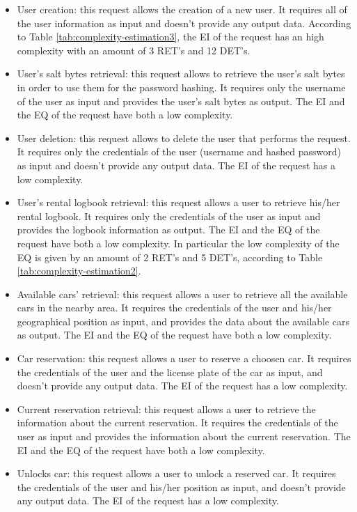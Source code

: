 \begin{itemize}
	\item User creation: this request allows the creation of a new user. It requires all of the user information as input and doesn't provide any output data. According to Table \ref{tab:complexity-estimation3}, the EI of the request has an high complexity with an amount of 3 RET's and 12 DET's.
	\item User's salt bytes retrieval: this request allows to retrieve the user's salt bytes in order to use them for the password hashing. It requires only the username of the user as input and provides the user's salt bytes as output. The EI and the EQ of the request have both a low complexity.
	\item User deletion: this request allows to delete the user that performs the request. It requires only the credentials of the user (username and hashed password) as input and doesn't provide any output data. The EI of the request has a low complexity.
	\item User's rental logbook retrieval: this request allows a user to retrieve his/her rental logbook. It requires only the credentials of the user as input and provides the logbook information as output. The EI and the EQ of the request have both a low complexity. In particular the low complexity of the EQ is given by an amount of 2 RET's and 5 DET's, according to Table \ref{tab:complexity-estimation2}.
	\item Available cars' retrieval: this request allows a user to retrieve all the available cars in the nearby area. It requires the credentials of the user and his/her geographical position as input, and provides the data about the available cars as output. The EI and the EQ of the request have both a low complexity.
	\item Car reservation: this request allows a user to reserve a choosen car. It requires the credentials of the user and the license plate of the car as input, and doesn't provide any output data. The EI of the request has a low complexity.
	\item Current reservation retrieval: this request allows a user to retrieve the information about the current reservation. It requires the credentials of the user as input and provides the information about the current reservation. The EI and the EQ of the request have both a low complexity.
	\item Unlocks car: this request allows a user to unlock a reserved car. It requires the credentials of the user and his/her position as input, and doesn't provide any output data. The EI of the request has a low complexity.

\end{itemize}
